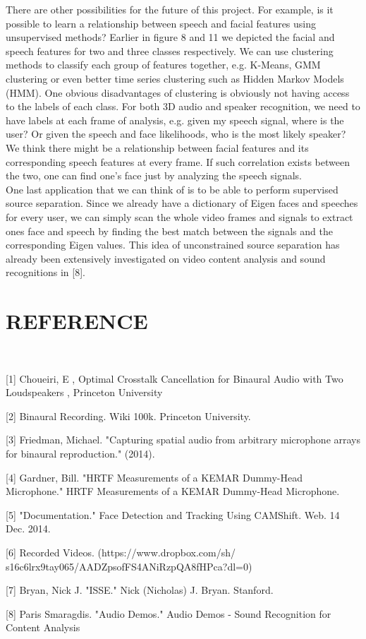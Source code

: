 \documentclass{article}
\begin{document}
There are other possibilities for the future of this project. For example, is it possible to learn a relationship between speech and facial features using unsupervised methods? Earlier in figure 8 and 11 we depicted the facial and speech features for two and three classes respectively. We can use clustering methods to classify each group of features together, e.g. K-Means, GMM clustering or even better time series clustering such as Hidden Markov Models (HMM). One obvious disadvantages of clustering is obviously not having access to the labels of each class. For both 3D audio and speaker recognition, we need to have labels at each frame of analysis, e.g. given my speech signal, where is the user? Or given the speech and face likelihoods, who is the most likely speaker? We think there might be a relationship between facial features and its corresponding speech features at every frame. If such correlation exists between the two, one can find one's face just by analyzing the speech signals. \\

One last application that we can think of is to be able to perform supervised source separation. Since we already have a dictionary of Eigen faces and speeches for every user, we can simply scan the whole video frames and signals to extract ones face and speech by finding the best match between the signals and the corresponding Eigen values. This idea of unconstrained source separation has already been extensively investigated on video content analysis and sound recognitions in [8]. 

\newpage
\section{REFERENCE}
\

[1] Choueiri, E , Optimal Crosstalk Cancellation for Binaural Audio with Two Loudspeakers , Princeton University 

\centerline{}

[2] Binaural Recording. Wiki 100k. Princeton University.

\centerline{}

[3] Friedman, Michael. "Capturing spatial audio from arbitrary microphone arrays for binaural reproduction." (2014).

\centerline{}

[4] Gardner, Bill. "HRTF Measurements of a KEMAR Dummy-Head Microphone." HRTF Measurements of a KEMAR Dummy-Head Microphone. 

\centerline{}

[5] "Documentation." Face Detection and Tracking Using CAMShift. Web. 14 Dec. 2014. 

\centerline{}

[6] Recorded Videos. (https://www.dropbox.com/sh/
s16c6lrx9tay065/AADZpsofFS4ANiRzpQA8fHPca?dl=0)

\centerline{}

[7] Bryan, Nick J. "ISSE." Nick (Nicholas) J. Bryan. Stanford.

\centerline{}

[8] Paris Smaragdis. "Audio Demos." Audio Demos - Sound Recognition for Content Analysis
\end{document}
